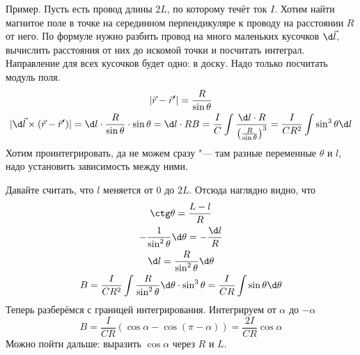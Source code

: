   Пример.
  Пусть есть провод длины $2L$, по которому течёт ток $I$.
  Хотим найти магнитое поле в точке на серединном перпендикуляре к проводу на расстоянии $R$ от него.
  По формуле нужно разбить провод на много маленьких кусочков $\d \vec l$,
  вычислить расстояния от них до искомой точки и посчитать интеграл.
  Направление для всех кусочков будет одно: в доску.
  Надо только посчитать модуль поля.
  \begin{gather*}
  | \vec r - \vec r' | = \frac R{\sin \theta} \\
  | \d \vec l \times (\vec r - \vec r') | = \d l \cdot \frac{R}{\sin \theta} \cdot \sin \theta = \d l \cdot R
  B = \frac I C \int \frac{\d l \cdot R}{\left(\frac R{\sin \theta}\right)^3}
    = \frac I {CR^2} \int \sin^3 \theta \d l
  \end{gather*}
  Хотим проинтегрировать, да не можем сразу "--- там разные переменные $\theta$ и $l$, надо установить зависимость между ними.
  
  Давайте считать, что $l$ меняется от $0$ до $2L$.
  Отсюда наглядно видно, что
  \begin{gather*}
    \ctg \theta = \frac{L-l}{R} \\
    - \frac 1 {\sin^2\theta} \d \theta = -\frac{\d l}{R} \\
   \d l = \frac{R}{\sin^2 \theta} \d \theta \\
    B = \frac{I}{CR^2} \int \frac{R}{\sin^2 \theta} \d \theta \cdot \sin^3 \theta
      = \frac{I}{CR} \int \sin \theta \d \theta
  \end{gather*}
  Теперь разберёмся с границей интегрирования.
  Интегрируем от $\alpha$ до $-\alpha$
  \[ B = \frac{I}{CR} (\cos \alpha - \cos(\pi-\alpha)) = \frac{2I}{CR} \cos \alpha\]
  Можно пойти дальше: выразить $\cos \alpha$ через $R$ и $L$.
